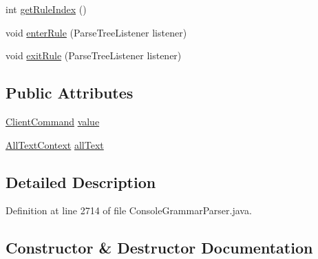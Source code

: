 \begin{DoxyCompactItemize}
\item 
int \hyperlink{classgov_1_1nasa_1_1jpf_1_1inspector_1_1client_1_1parser_1_1_console_grammar_parser_1_1_cmd_record_context_a45e514ceedcadac14ed768101283fe76}{get\+Rule\+Index} ()
\item 
void \hyperlink{classgov_1_1nasa_1_1jpf_1_1inspector_1_1client_1_1parser_1_1_console_grammar_parser_1_1_cmd_record_context_a6ebb124bf03552cba80ebcbe4f478c86}{enter\+Rule} (Parse\+Tree\+Listener listener)
\item 
void \hyperlink{classgov_1_1nasa_1_1jpf_1_1inspector_1_1client_1_1parser_1_1_console_grammar_parser_1_1_cmd_record_context_a4905fd273737e0f78a776b0bb5e73145}{exit\+Rule} (Parse\+Tree\+Listener listener)
\end{DoxyCompactItemize}
\subsection*{Public Attributes}
\begin{DoxyCompactItemize}
\item 
\hyperlink{classgov_1_1nasa_1_1jpf_1_1inspector_1_1client_1_1_client_command}{Client\+Command} \hyperlink{classgov_1_1nasa_1_1jpf_1_1inspector_1_1client_1_1parser_1_1_console_grammar_parser_1_1_cmd_record_context_a1ffc62df19c5063fd200d75cbd2f1e94}{value}
\item 
\hyperlink{classgov_1_1nasa_1_1jpf_1_1inspector_1_1client_1_1parser_1_1_console_grammar_parser_1_1_all_text_context}{All\+Text\+Context} \hyperlink{classgov_1_1nasa_1_1jpf_1_1inspector_1_1client_1_1parser_1_1_console_grammar_parser_1_1_cmd_record_context_a09b65c3a26162fc81f7828901a1bf906}{all\+Text}
\end{DoxyCompactItemize}


\subsection{Detailed Description}


Definition at line 2714 of file Console\+Grammar\+Parser.\+java.



\subsection{Constructor \& Destructor Documentation}
